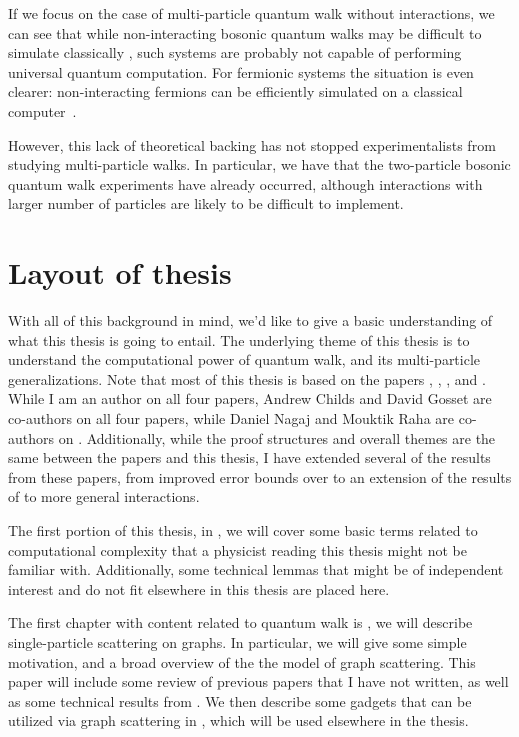 \documentclass[../thesis-main/thesis-main]{subfiles}
\begin{document}
If we focus on the case of multi-particle quantum walk without interactions, we can see that while non-interacting bosonic quantum walks may be difficult to simulate classically \cite{AA11}, such systems are probably not capable of performing universal quantum computation.  For fermionic systems the situation is even clearer: non-interacting fermions can be efficiently simulated on a classical computer~\cite{TD02}.

However, this lack of theoretical backing has not stopped experimentalists from studying multi-particle walks.  In particular, we have that the two-particle bosonic quantum walk experiments \cite{BLMS09,PLM10,OBB11,SSVMCRO12} have already occurred, although interactions with larger number of particles are likely to be difficult to implement.



\section{Layout of thesis}

With all of this background in mind, we'd like to give a basic understanding of what this thesis is going to entail.  The underlying theme of this thesis is to understand the computational power of quantum walk, and its multi-particle generalizations.  Note that most of this thesis is based on the papers \cite{MPQW}, \cite{MomSwitches}, \cite{BHQMA}, and \cite{XYQMA}.  While I am an author on all four papers, Andrew Childs and David Gosset are co-authors on all four papers, while Daniel Nagaj and Mouktik Raha are co-authors on \cite{MomSwitches}.  Additionally, while the proof structures and overall themes are the same between the papers and this thesis, I have extended several of the results from these papers, from improved error bounds over \cite{MPQW} to an extension of the results of \cite{BHQMA} to more general interactions. 

The first portion of this thesis, in , we will cover some basic terms related to computational complexity that a physicist reading this thesis might not be familiar with.  Additionally, some technical lemmas that might be of independent interest and do not fit elsewhere in this thesis are placed here.

The first chapter with content related to quantum walk is , we will describe single-particle scattering on graphs.  In particular, we will give some simple motivation, and a broad overview of the the model of graph scattering.  This paper will include some review of previous papers \cite{Chi09,CG12} that I have not written, as well as some technical results from \cite{MPQW}.  We then describe some gadgets that can be utilized via graph scattering in , which will be used elsewhere in the thesis.  
\end{document}

